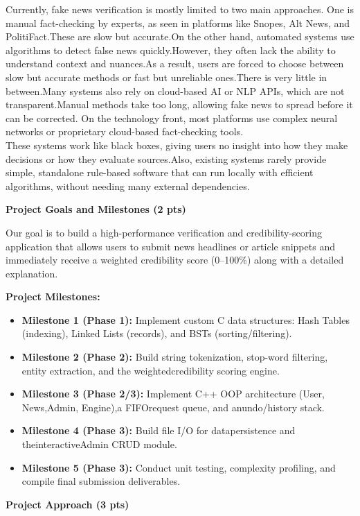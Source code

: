 \documentclass[10pt,a4paper]{article}
\newcommand{\blueheading}[1]{%
    \vspace{2.5mm}%
    {\bfseries\color{TitleBlue}\fontsize{11}{13}\selectfont #1}\par
}
\begin{document}
\begin{dynamicanswerbox}
Currently, fake news verification is mostly limited to two main approaches.
One is manual fact-checking by experts, as seen in platforms like Snopes, Alt News, and PolitiFact.These are slow but accurate.On the other hand, automated systems use algorithms to detect false news quickly.However, they often lack the ability to understand context and nuances.As a result, users are forced to choose between slow but accurate methods or fast but unreliable ones.There is very little in between.Many systems also rely on cloud-based AI or NLP APIs, which are not transparent.Manual methods take too long, allowing fake news to spread before it can be corrected.
On the technology front, most platforms use complex neural networks or proprietary cloud-based fact-checking tools.\\
These systems work like black boxes, giving users no insight into how they make decisions or how they evaluate sources.Also, existing systems rarely provide simple, standalone rule-based software that can run locally with efficient algorithms, without needing many external dependencies.
\end{dynamicanswerbox}
\vspace{10mm}
\blueheading{Project Goals and Milestones (2 pts)}

\begin{dynamicanswerbox}
Our goal is to build a high-performance verification and credibility-scoring application that allows users to submit news headlines or article snippets and immediately receive a weighted credibility score (0–100\%) along with a detailed explanation.

\vspace{1mm}
\textbf{Project Milestones:}
\begin{itemize}[leftmargin=4.5mm,itemsep=1.5pt,topsep=1.5pt,partopsep=0pt,parsep=0pt]
    \item \textbf{Milestone 1 (Phase 1):}  Implement custom C data structures: Hash Tables (indexing), Linked Lists (records), and BSTs (sorting/filtering).
    \item \textbf{Milestone 2 (Phase 2):}  Build string tokenization, stop-word filtering, entity extraction, and the weightedcredibility scoring engine.
    \item \textbf{Milestone 3 (Phase 2/3):}  Implement C++ OOP architecture (User, News,Admin, Engine),a FIFOrequest queue, and anundo/history stack.
    \item \textbf{Milestone 4 (Phase 3):}  Build file I/O for datapersistence and theinteractiveAdmin CRUD module.
    \item \textbf{Milestone 5 (Phase 3):}  Conduct unit testing, complexity profiling, and compile final submission deliverables.
\end{itemize}
\end{dynamicanswerbox}
\vspace{10mm}
\blueheading{Project Approach (3 pts)}
\end{document}
